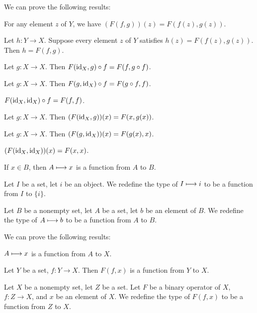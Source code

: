 \documentclass{article}
\begin{document}
We can prove the following results:
\begin{thm}
\item\label{funcop1:37} For any element $z$ of $Y$, we have $(F(f,g))(z)=F(f(z),g(z))$.
\item\label{funcop1:38} Let $h\colon Y\to X$.
  Suppose every element $z$ of $Y$ satisfies $h(z)=F(f(z),g(z))$.
  Then $h=F(f,g)$.
\item\label{funcop1:39} Let $g\colon X\to X$.
  Then $F(\operatorname{id}_{X},g)\circ f=F(f,g\circ f)$.
\item\label{funcop1:40} Let $g\colon X\to X$.
  Then $F(g,\operatorname{id}_{X})\circ f=F(g\circ f,f)$.
\item\label{funcop1:41} $F(\operatorname{id}_{X},\operatorname{id}_{X})\circ f=F(f,f)$.
\item\label{funcop1:42} Let $g\colon X\to X$.
  Then $(F(\operatorname{id}_{X},g))(x)=F(x,g(x))$.
\item\label{funcop1:43} Let $g\colon X\to X$.
  Then $(F(g,\operatorname{id}_{X}))(x)=F(g(x),x)$.
\item\label{funcop1:44} $(F(\operatorname{id}_{X},\operatorname{id}_{X}))(x)=F(x,x)$. 
\item\label{funcop1:45} If $x\in B$, then $A\longmapsto x$ is a function
  from $A$ to $B$.
\end{thm}

\begin{definition}
Let $I$ be a set, let $i$ be an object.
We redefine the type of $I\longmapsto i$ to be a function from $I$ to $\{i\}$.
\end{definition}

\begin{definition}
Let $B$ be a nonempty set, let $A$ be a set, let $b$ be an element of $B$.
We redefine the type of $A\longmapsto b$ to be a function from $A$ to $B$.
\end{definition}

We can prove the following results:
\begin{thm}
\item\label{funcop1:46} $A\longmapsto x$ is a function from $A$ to $X$.
\item\label{funcop1:47} Let $Y$ be a set, $f\colon Y\to X$. Then
  $F(f,x)$ is a function from $Y$ to $X$.
\end{thm}

\begin{definition}
Let $X$ be a nonempty set, let $Z$ be a set.
Let $F$ be a binary operator of $X$, $f\colon Z\to X$, and $x$ be an
element of $X$.
We redefine the type of $F(f,x)$ to be a function from $Z$ to $X$.
\end{definition}
\end{document}

